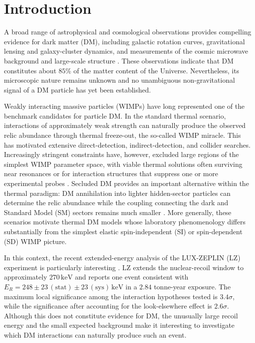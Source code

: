 \documentclass[aps,prd,reprint,superscriptaddress,nofootinbib,longbibliography,floatfix]{revtex4-2}
\newcommand{\keV}{\mathrm{keV}}
\begin{document}
\section{Introduction}

A broad range of astrophysical and cosmological observations provides compelling evidence for dark matter (DM), including galactic rotation curves, gravitational lensing and galaxy-cluster dynamics, and measurements of the cosmic microwave background and large-scale structure \cite{Rubin1980,Clowe2006,Planck2018}. These observations indicate that DM constitutes about $85\%$ of the matter content of the Universe. Nevertheless, its microscopic nature remains unknown and no unambiguous non-gravitational signal of a DM particle has yet been established.

Weakly interacting massive particles (WIMPs) have long represented one of the benchmark candidates for particle DM. In the standard thermal scenario, interactions of approximately weak strength can naturally produce the observed relic abundance through thermal freeze-out, the so-called WIMP miracle. This has motivated extensive direct-detection, indirect-detection, and collider searches. Increasingly stringent constraints have, however, excluded large regions of the simplest WIMP parameter space, with viable thermal solutions often surviving near resonances or for interaction structures that suppress one or more experimental probes \cite{Arcadi2018,LZ2025WIMP,XENONnT2025,DiMauroXie2026,KongDiMauro2026,KoechlerDiMauro2025}. Secluded DM provides an important alternative within the thermal paradigm: DM annihilation into lighter hidden-sector particles can determine the relic abundance while the coupling connecting the dark and Standard Model (SM) sectors remains much smaller \cite{PospelovRitzVoloshin2008,DiMauroWang2026,DiMauroNeutrino2026}. More generally, these scenarios motivate thermal DM models whose laboratory phenomenology differs substantially from the simplest elastic spin-independent (SI) or spin-dependent (SD) WIMP picture.

In this context, the recent extended-energy analysis of the LUX-ZEPLIN (LZ) experiment is particularly interesting \cite{LZ2026Extended}. LZ extends the nuclear-recoil window to approximately $270\,\keV$ and reports one event consistent with
$E_R=248\pm23\,(\mathrm{stat})\pm23\,(\mathrm{sys})\,\keV$
in a $2.84$ tonne-year exposure. The maximum local significance among the interaction hypotheses tested is $3.4\sigma$, while the significance after accounting for the look-elsewhere effect is $2.6\sigma$. Although this does not constitute evidence for DM, the unusually large recoil energy and the small expected background make it interesting to investigate which DM interactions can naturally produce such an event.
\end{document}
